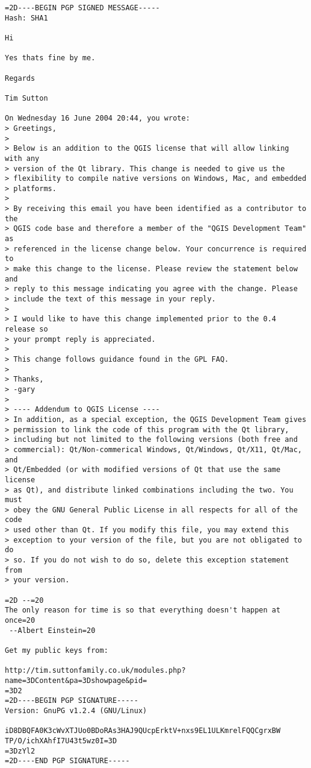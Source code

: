 \begin{small}
\begin{verbatim}
=2D----BEGIN PGP SIGNED MESSAGE-----
Hash: SHA1

Hi

Yes thats fine by me.

Regards

Tim Sutton

On Wednesday 16 June 2004 20:44, you wrote:
> Greetings,
>
> Below is an addition to the QGIS license that will allow linking with any
> version of the Qt library. This change is needed to give us the
> flexibility to compile native versions on Windows, Mac, and embedded
> platforms.
>
> By receiving this email you have been identified as a contributor to the
> QGIS code base and therefore a member of the "QGIS Development Team" as
> referenced in the license change below. Your concurrence is required to
> make this change to the license. Please review the statement below and
> reply to this message indicating you agree with the change. Please
> include the text of this message in your reply.
>
> I would like to have this change implemented prior to the 0.4 release so
> your prompt reply is appreciated.
>
> This change follows guidance found in the GPL FAQ.
>
> Thanks,
> -gary
>
> ---- Addendum to QGIS License ----
> In addition, as a special exception, the QGIS Development Team gives
> permission to link the code of this program with the Qt library,
> including but not limited to the following versions (both free and
> commercial): Qt/Non-commerical Windows, Qt/Windows, Qt/X11, Qt/Mac, and
> Qt/Embedded (or with modified versions of Qt that use the same license
> as Qt), and distribute linked combinations including the two. You must
> obey the GNU General Public License in all respects for all of the code
> used other than Qt. If you modify this file, you may extend this
> exception to your version of the file, but you are not obligated to do
> so. If you do not wish to do so, delete this exception statement from
> your version.

=2D --=20
The only reason for time is so that everything doesn't happen at once=20
 --Albert Einstein=20

Get my public keys from:

http://tim.suttonfamily.co.uk/modules.php?name=3DContent&pa=3Dshowpage&pid=
=3D2
=2D----BEGIN PGP SIGNATURE-----
Version: GnuPG v1.2.4 (GNU/Linux)

iD8DBQFA0K3cWvXTJUo0BDoRAs3HAJ9QUcpErktV+nxs9EL1ULKmrelFQQCgrxBW
TP/O/ichXAhfI7U43t5wz0I=3D
=3DzYl2
=2D----END PGP SIGNATURE-----



\end{verbatim}
\end{small}
